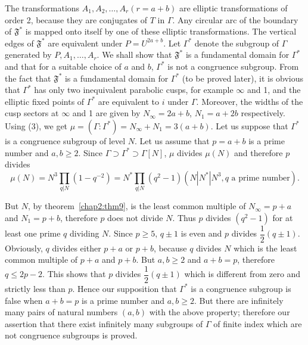 The transformations $A_1, A_2, \ldots, A_r(r=a+b)$ are elliptic
transformations of order 2, because they are conjugates of $T$ in
$\Gamma$. Any circular arc of the boundary of $\mathfrak{F}^{\ast}$ is
mapped onto itself by one of these elliptic transformations. The
vertical edges of $\mathfrak{F}^{\ast}$ are equivalent under
$P=U^{2a+b}$. Let $\Gamma^{\ast}$ denote the subgroup of $\Gamma$
generated by $P,A_1, \ldots, A_r$. We shall show that
$\mathfrak{F}^{\ast}$ is a fundamental domain for $\Gamma^{\ast}$ and
that for a suitable choice of $a$ and $b$, $\Gamma^{\ast}$ is not a
congruence subgroup. From the fact that $\mathfrak{F}^{\ast}$ is a
fundamental domain for $\Gamma^{\ast}$ (to be proved later), it is
obvious that $\Gamma^{\ast}$ has only two inequivalent parabolic
cusps, for example $\infty$ and 1, and the elliptic fixed points of
$\Gamma^{\ast}$ are equivalent to $i$ under $\Gamma$. Moreover, the
widths of the cusp sectors at $\infty$ and 1 are given by
$N_{\infty}=2a+b$, $N_1=a+2b$ respectively. Using (3), we get $\mu =
(\Gamma:\Gamma^{\ast}) = N_{\infty}+N_1=3(a+b)$. Let us suppose that
$\Gamma^{\ast}$ is a congruence subgroup of level $N$. Let us assume
that $p=a+b$ is a prime number and $a,b\geq 2$. Since $\Gamma\supset
\Gamma^{\ast} \supset \Gamma [N]$, $\mu$ divides $\mu(N)$ and
therefore $p$ divides 
$$
\mu(N) = N^3 \prod_{q|N} (1-q^{-2}) = N^{\ast} \prod_{q|N} (q^2-1)
(N|N^{\ast}|N^3, q \text{ a prime number}).
$$\pageoriginale 

But $N$, by theorem~\ref{chap2:thm9}, is the least common multiple of
$N_{\infty}=p+a$ and $N_1 = p + b$, therefore $p$ does not divide
$N$. Thus $p$ divides $(q^2-1)$ for at least one prime $q$ dividing
$N$. Since $p\geq 5$, $q\pm 1$ is even and $p$ divides
$\dfrac{1}{2}(q\pm 1)$. Obviously, $q$ divides either $p+a$ or $p+b$,
because $q$ divides $N$ which is the least common multiple of $p+a$
and $p+b$. But $a, b\geq 2$ and $a+b=p$, therefore $q\leq 2 p-2$. This
shows that $p$ divides $\dfrac{1}{2}(q\pm 1)$ which is different from
zero and strictly less than $p$. Hence our supposition that
$\Gamma^{\ast}$ is a congruence subgroup is false when $a+b=p$ is a
prime number and $a,b\geq 2$. But there are infinitely many pairs of
natural numbers $(a,b)$ with the above property; therefore our
assertion that there exist infinitely many subgroups of $\Gamma$ of
finite index which are not congruence subgroups is proved.

